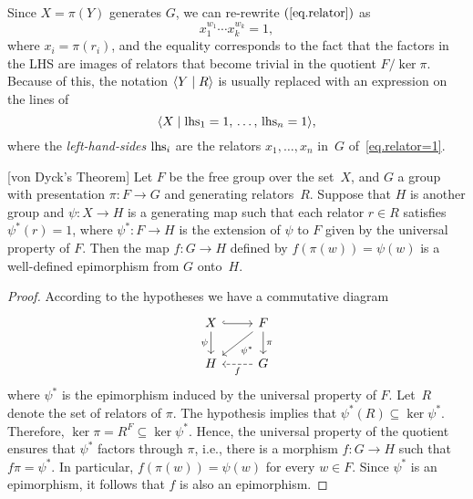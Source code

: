 \begin{defns}
    Since $X=\pi(Y)$ generates $G$, we can re-rewrite $(\ref{eq.relator})$ as
    \begin{equation}\label{eq.relator=1}
        x_1^{w_1}\cdots x_k^{w_k}=1,
    \end{equation}
    where $x_i=\pi(r_i)$, and the equality corresponds to the fact that the factors in the LHS are images of relators that become trivial in the quotient $F/\ker\pi$. Because of this, the notation $\langle Y\mid R\rangle$ is usually replaced with an expression on the lines of
    $$
        \langle X\mid \operatorname{lhs}_1=1,\,\dots,\,\operatorname{lhs}_n=1\rangle,
    $$
    where the \textit{left-hand-sides\/} $\operatorname{lhs}_i$ are the relators $x_1,\dots,x_n$ in~$G$ of~\eqref{eq.relator=1}.
\end{defns}


\begin{thm}\label{von-dyck-thm} \textrm{\rm[von Dyck's Theorem]}
    Let $F$ be the free group over the set\/~$X$, and\/ $G$ a group with presentation\/ $\pi\colon F \to G$ and generating relators\/~$R$. Suppose that\/ $H$ is another group and\/ $\psi: X \to H$ is a generating map such that each relator\/ $r\in R$ satisfies\/ $\psi^*(r)=1$, where\/ $\psi^*\colon F\to H$ is the extension of\/ $\psi$ to $F$ given by the universal property of\/ $F$. Then the map\/ $f\colon G \to H$ defined by\/ $f(\pi(w)) = \psi(w)$ is a well-defined epimorphism from\/ $G$ onto~$H$.
\end{thm}

\begin{proof}
    According to the hypotheses we have a commutative diagram
    $$
        \begin{tikzcd}
            X
                    \arrow[r,hook]
                    \arrow[d,"\psi"']
                &F
                    \arrow[d,"\pi"]
                    \arrow[ld,"\psi^*"]\\
            H
                &G
                    \arrow[l,"f",dashed]
        \end{tikzcd}
    $$
    where $\psi^*$ is the epimorphism induced by the universal property of $F$.
    Let~$R$ denote the set of relators of $\pi$. The hypothesis implies that $\psi^*(R)\subseteq\ker\psi^*$. Therefore, $\ker\pi=R^F\subseteq\ker\psi^*$. Hence, the universal property of the quotient ensures that $\psi^*$ factors through $\pi$, i.e., there is a morphism $f\colon G\to H$ such that $f\pi=\psi^*$. In particular, $f(\pi(w))=\psi(w)$ for every $w\in F$. Since $\psi^*$ is an epimorphism, it follows that $f$ is also an epimorphism.
\end{proof}


